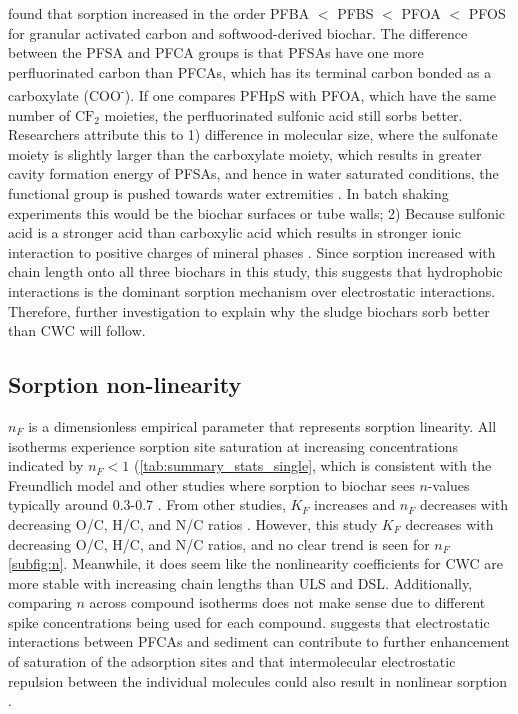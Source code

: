 \cite{zhang2021sorption} found that sorption increased in the order PFBA $<$ PFBS $<$ PFOA $<$ PFOS for granular activated carbon and softwood-derived biochar. The difference between the PFSA and PFCA groups is that PFSAs have one more perfluorinated carbon than PFCAs, which has its terminal carbon bonded as a carboxylate (COO\textsuperscript{-}). If one compares PFHpS with PFOA, which have the same number of $\mathrm{CF_2}$ moieties, the perfluorinated sulfonic acid still sorbs better. Researchers attribute this to 1) difference in molecular size, where the sulfonate moiety is slightly larger than the carboxylate moiety, which results in greater cavity formation energy of PFSAs, and hence in water saturated conditions, the functional group is pushed towards water extremities \citep{yin2022insights,sigmund2022sorption}. In batch shaking experiments this would be the biochar surfaces or tube walls; 2) Because sulfonic acid is a stronger acid than carboxylic acid which results in stronger ionic interaction to positive charges of mineral phases \citep{arvaniti2015review}. Since sorption increased with chain length onto all three biochars in this study, this suggests that hydrophobic interactions is the dominant sorption mechanism over electrostatic interactions. Therefore, further investigation to explain why the sludge biochars sorb better than CWC will follow. 

\subsection{Sorption non-linearity}
$n_F$ is a dimensionless empirical parameter that represents sorption linearity. All isotherms experience sorption site saturation at increasing concentrations indicated by $n_F<1 $ (\cref{tab:summary_stats_single}, which is consistent with the Freundlich model and other studies where sorption to biochar sees $n$-values typically around 0.3-0.7 \citep{Cornelissen2005}. From other studies, $K_F$ increases and $n_F$ decreases with decreasing O/C, H/C, and N/C ratios \citep{Cornelissen2005}. However, this study $K_F$ decreases with decreasing O/C, H/C, and N/C ratios, and no clear trend is seen for $n_F$ \cref{subfig:n}. Meanwhile, it does seem like the nonlinearity coefficients for CWC are more stable with increasing chain lengths than ULS and DSL. Additionally, comparing $n$ across compound isotherms does not make sense due to different spike concentrations being used for each compound. \citep{yin2022insights} suggests that electrostatic interactions between PFCAs and sediment can contribute to further enhancement of saturation of the adsorption sites and that intermolecular electrostatic repulsion between the individual molecules could also result in nonlinear sorption \citep{higgins2006sorption,yin2022insights}.

